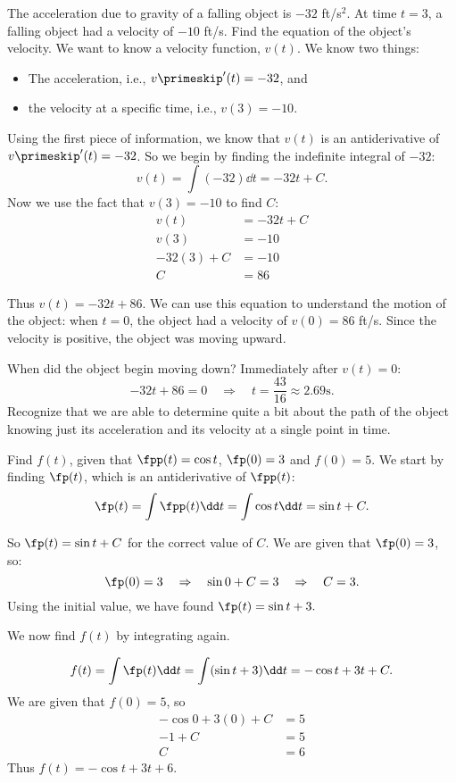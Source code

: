 \begin{example}\label{ex_anti4}
The acceleration due to gravity of a falling object is $-32$ ft/s$^2$. At time $t=3$, a falling object had a velocity of $-10$ ft/s. Find the equation of the object's velocity.
\solution
We want to know a velocity function, $v(t)$. We know two things:
	\begin{itemize}
		\item		The acceleration, i.e., $v\primeskip'(t)= -32$, and
		\item		the velocity at a specific time, i.e., $v(3) = -10$.
	\end{itemize}
Using the first piece of information, we know that $v(t)$ is an antiderivative of $v\primeskip'(t)=-32$. So we begin by finding the indefinite integral of $-32$:
\[v(t)=\int (-32)\dd t = -32t+C.\]
Now we use the fact that $v(3)=-10$ to find $C$:
\begin{align*}
	v(t) &= -32t+C \\
	v(3) &= -10 \\
	-32(3)+C &= -10\\
	C &= 86
\end{align*}

Thus $v(t)= -32t+86$. We can use this equation to understand the motion of the object: when $t=0$, the object had a velocity of $v(0) = 86$ ft/s. Since the velocity is positive, the object was moving upward.

When did the object begin moving down? Immediately after $v(t) = 0$:
\[-32t+86 = 0 \quad \Rightarrow\quad  t = \frac{43}{16}  \approx 2.69\text{s}.\]
Recognize that we are able to determine quite a bit about the path of the object knowing just its acceleration and its velocity at a single point in time.
\end{example}

\begin{example}\label{ex_anti5}
Find $f(t)$, given that $\fpp(t) = \cos t$, $\fp(0) = 3$ and $f(0) = 5$.
\solution
We start by finding $\fp(t)$, which is an antiderivative of $\fpp(t)$:
\[\fp(t)=\int \fpp(t)\dd t = \int \cos t\dd t = \sin t + C.\]

So $\fp(t) = \sin t+C$ for the correct value of $C$. We are given that $\fp(0) = 3$, so:
\[\fp(0) = 3 \quad \Rightarrow \quad \sin 0+C = 3 \quad \Rightarrow \quad C=3.\]
Using the initial value, we have found $\fp(t) = \sin t+ 3.$
		
We now find $f(t)$ by integrating again.

\[f(t)=\int \fp(t) \dd t = \int (\sin t+3)\dd t = -\cos t + 3t + C.\]
We are given that $f(0) = 5$, so
\begin{align*}
-\cos 0 + 3(0) + C &= 5 \\
-1 + C &= 5\\
C &= 6
\end{align*}
 Thus $f(t) = -\cos t + 3t + 6$.
\end{example}

